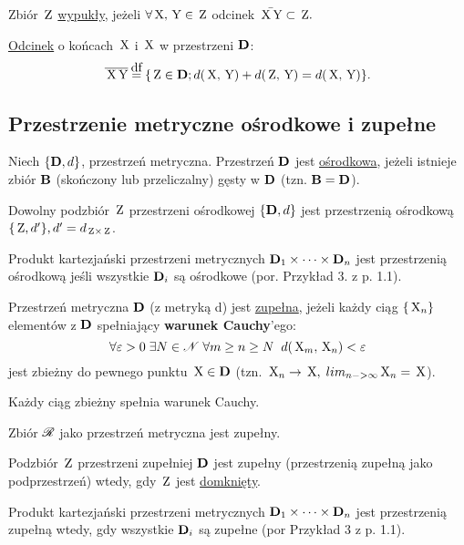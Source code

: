 \begin{mydef}
    Zbiór $\mathbf{\,\textnormal{Z}}$ \underline{wypukły}, jeżeli $\forall \,\textnormal{X},\,\textnormal{Y} \in \mathbf{\,\textnormal{Z}}$ odcinek $\bar{\,\textnormal{X}\,\textnormal{Y}} \subset \mathbf{\,\textnormal{Z}}.$
\end{mydef}

\begin{mydef}
    \underline{Odcinek} o końcach $\,\textnormal{X}$ i $\,\textnormal{X}$ w przestrzeni $\mathbf{D}$:
    \[\overline{\p{X}\p{Y}} \df \{\p{Z}\in\set{D}; d(\p{X},\p{Y}) + d(\p{Z},\p{Y}) = d(\p{X},\p{Y}) \}.\]
\end{mydef}


\subsection{Przestrzenie metryczne ośrodkowe i zupełne}

\begin{mydef}
    Niech $\{\mathbf{D}, d\}$, przestrzeń metryczna. Przestrzeń $\mathbf{D}$ jest \underline{ośrodkowa}, jeżeli istnieje zbiór $\mathbf{B}$ (skończony lub przeliczalny) gęsty w $\mathbf{D}$ (tzn. $\mathbf{B} = \mathbf{D}$).
\end{mydef}

\begin{info}
    Dowolny podzbiór $\mathbf{\,\textnormal{Z}}$ przestrzeni ośrodkowej $\{\mathbf{D}, d\}$ jest przestrzenią ośrodkową $\{\mathbf{\,\textnormal{Z}}, d'\}, d'=d_{\mathbf{\,\textnormal{Z}} \times \mathbf{\,\textnormal{Z}}}$.
\end{info}

\begin{info}
    Produkt kartezjański przestrzeni metrycznych $\mathbf{D}_1 \times \dots \times \mathbf{D}_n$ jest przestrzenią ośrodkową jeśli wszystkie $\mathbf{D}_i$ są ośrodkowe (por. Przykład 3. z p. 1.1).
\end{info}

\begin{mydef}
    Przestrzeń metryczna $\mathbf{D}$ (z metryką d) jest \underline{zupełna}, jeżeli każdy ciąg $\{\,\textnormal{X}_n\}$ elementów z $\mathbf{D}$ spełniający \textbf{warunek Cauchy}'ego:
    \[\forall \varepsilon>0 \;\exists N \in \mathscr{N} \;\forall m \geq n \geq N \;\; d(\,\textnormal{X}_m, \,\textnormal{X}_n) < \varepsilon\]
    jest zbieżny do pewnego punktu $\,\textnormal{X} \in \mathbf{D}$ (tzn. $\,\textnormal{X}_n \to \,\textnormal{X}, \; lim_{n->\infty} \,\textnormal{X}_n = \,\textnormal{X}$).
\end{mydef}

\begin{info}
   Każdy ciąg zbieżny spełnia warunek Cauchy.
\end{info}
\begin{info}
   Zbiór $\mathscr{R}$ jako przestrzeń metryczna jest zupełny.
\end{info}
\begin{info}
   Podzbiór $\mathbf{\,\textnormal{Z}}$ przestrzeni zupełniej $\mathbf{D}$ jest zupełny (przestrzenią zupełną jako podprzestrzeń) wtedy, gdy $\mathbf{\,\textnormal{Z}}$ jest \underline{domknięty}.
\end{info}
\begin{info}
   Produkt kartezjański przestrzeni metrycznych $\mathbf{D}_1 \times \dots \times \mathbf{D}_n$ jest przestrzenią zupełną wtedy, gdy wszystkie $\mathbf{D}_i$ są zupełne (por Przykład 3 z p. 1.1).
\end{info}
